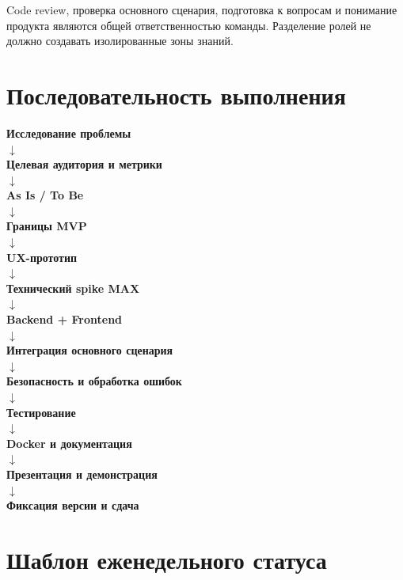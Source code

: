 \documentclass[11pt,a4paper]{article}
\begin{document}
\begin{summarybox}
Code review, проверка основного сценария, подготовка к вопросам и понимание продукта являются общей ответственностью команды. Разделение ролей не должно создавать изолированные зоны знаний.
\end{summarybox}

\section{Последовательность выполнения}

\begin{center}
\begin{tcolorbox}[width=0.82\textwidth,colback=Panel,colframe=MaxCyan,arc=3mm,boxrule=1pt]
\centering
\textbf{Исследование проблемы}\\[1mm]
$\downarrow$\\
\textbf{Целевая аудитория и метрики}\\[1mm]
$\downarrow$\\
\textbf{As Is / To Be}\\[1mm]
$\downarrow$\\
\textbf{Границы MVP}\\[1mm]
$\downarrow$\\
\textbf{UX-прототип}\\[1mm]
$\downarrow$\\
\textbf{Технический spike MAX}\\[1mm]
$\downarrow$\\
\textbf{Backend + Frontend}\\[1mm]
$\downarrow$\\
\textbf{Интеграция основного сценария}\\[1mm]
$\downarrow$\\
\textbf{Безопасность и обработка ошибок}\\[1mm]
$\downarrow$\\
\textbf{Тестирование}\\[1mm]
$\downarrow$\\
\textbf{Docker и документация}\\[1mm]
$\downarrow$\\
\textbf{Презентация и демонстрация}\\[1mm]
$\downarrow$\\
\textbf{Фиксация версии и сдача}
\end{tcolorbox}
\end{center}

\clearpage
\section{Шаблон еженедельного статуса}
\end{document}
